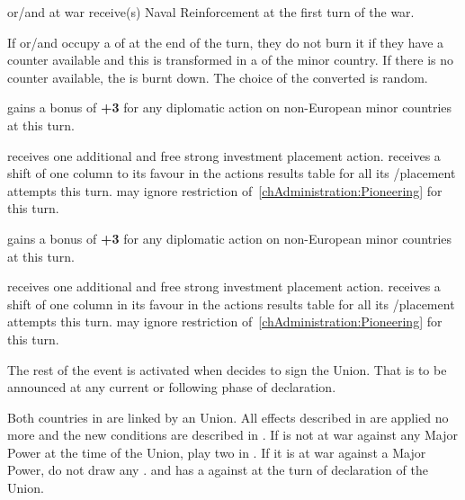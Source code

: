 \phadm
\aparag \paysOman or/and \paysAden at war receive(s) Naval Reinforcement at
the first turn of the war.

\phinter
\aparag If \paysOman or/and \paysAden occupy a \TP of \POR at the end of the
turn, they do not burn it if they have a \TP counter available and this \TP is
transformed in a \TP of the minor country. If there is no counter available,
the \TP is burnt down. The choice of the \TP converted is random.




\phdipl
\aparag \POR gains a bonus of {\bf +3} for any diplomatic action on
non-European minor countries at this turn.

\phadm
\aparag \POR receives one additional and free strong investment \TP placement
action.
\aparag \POR receives a shift of one column to its favour in the actions
results table for all its \COL/\TP placement attempts this turn.
\aparag \POR may ignore restriction of~\ref{chAdministration:Pioneering} for
this turn.




\phdipl
\aparag \SPA gains a bonus of {\bf +3} for any diplomatic action on
non-European minor countries at this turn.

\phadm
\aparag \SPA receives one additional and free strong investment \COL placement
action.
\aparag \SPA receives a shift of one column in its favour in the actions
results table for all its \COL/\TP placement attempts this turn.
\aparag \SPA may ignore restriction of~\ref{chAdministration:Pioneering} for
this turn.






\activation{}
\aparag The rest of the event is activated when \POL decides to sign the
Union. That is to be announced at any current or following phase of
declaration.

\phdipl
\aparag Both countries in \POL are linked by an Union. All effects described
in  are applied no more and the new
conditions are described in .
\aparag If \POL is not at war against any Major Power at the time of the
Union, play two \REVOLT in \POL. If it is at war against a Major Power, do not
draw any \REVOLT .
\aparag \RUS and \SUE has a \CB against \POL at the turn of declaration of the
Union.

